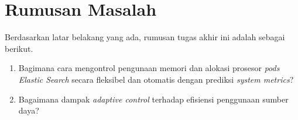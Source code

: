 \section{Rumusan Masalah}

Berdasarkan latar belakang yang ada, rumusan tugas akhir ini adalah sebagai berikut.
\begin{enumerate}
    \item Bagimana cara mengontrol pengunaan memori dan alokasi prosesor \textit{pods Elastic Search} secara fleksibel dan otomatis dengan prediksi \textit{system metrics}?
    \item Bagaimana dampak \textit{adaptive control} terhadap efisiensi penggunaan sumber daya?
\end{enumerate}